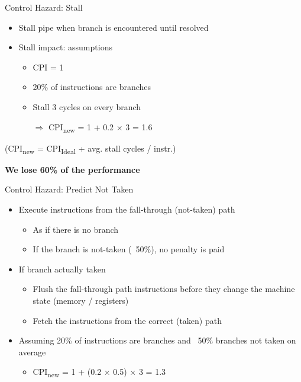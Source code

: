 \documentclass[aspectratio=169,12pt]{beamer}
\begin{document}
\begin{frame}{Control Hazard: Stall}
    \begin{itemize}
        \item Stall pipe when branch is encountered until resolved
        \item Stall impact: assumptions
        \begin{itemize}
            \item CPI = 1
            \item 20\% of instructions are branches
            \item Stall 3 cycles on every branch
            \item[$\Rightarrow$] CPI\textsubscript{new} = 1 + 0.2 × 3 = 1.6
        \end{itemize}
    \end{itemize}
    
    \vspace{0.5cm}
    \centering
    (CPI\textsubscript{new} = CPI\textsubscript{Ideal} + avg. stall cycles / instr.)
    
    \vspace{0.5cm}
    \textbf{We lose 60\% of the performance}
\end{frame}

\begin{frame}{Control Hazard: Predict Not Taken}
    \begin{itemize}
        \item Execute instructions from the fall-through (not-taken) path
        \begin{itemize}
            \item As if there is no branch
            \item If the branch is not-taken (~50\%), no penalty is paid
        \end{itemize}
        \item If branch actually taken
        \begin{itemize}
            \item Flush the fall-through path instructions before they change the machine state (memory / registers)
            \item Fetch the instructions from the correct (taken) path
        \end{itemize}
        \item Assuming 20\% of instructions are branches and ~50\% branches not taken on average
        \begin{itemize}
            \item CPI\textsubscript{new} = 1 + (0.2 × 0.5) × 3 = 1.3
        \end{itemize}
    \end{itemize}
\end{frame}
\end{document}
